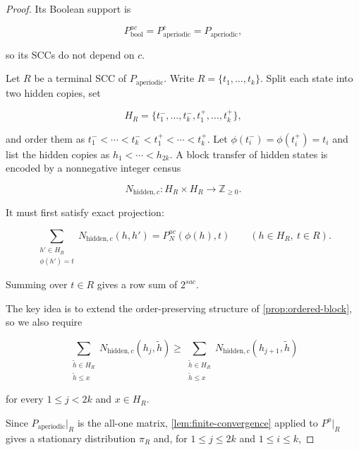 \documentclass[10pt]{article}
\theoremstyle{definition}
\begin{document}
\begin{proof}
Its Boolean support is

\begin{equation}
 P_{\mathrm{bool}}^{ac}
 =
 P_{\mathrm{aperiodic}}^c
 =
 P_{\mathrm{aperiodic}},
\end{equation}

so its SCCs do not depend on $c$.

Let $R$ be a terminal SCC of $P_{\mathrm{aperiodic}}$.  Write
$R=\{t_1,\ldots,t_k\}$.  Split each state into two hidden copies, set

\begin{equation}
 H_R=\{t_1^-,\ldots,t_k^-,t_1^+,\ldots,t_k^+\},
\end{equation}

and order them as
$t_1^-<\cdots<t_k^-<t_1^+<\cdots<t_k^+$.  Let
$\phi(t_i^-)=\phi(t_i^+)=t_i$ and list the hidden copies as
$h_1<\cdots<h_{2k}$.  A block transfer of hidden states is encoded by a
nonnegative integer census

\begin{equation}
 N_{\mathrm{hidden},c}:H_R\times H_R\longrightarrow\mathbb Z_{\ge0}.
\end{equation}

It must first satisfy exact projection:

\begin{equation}
 \sum_{\substack{h'\in H_R\\\phi(h')=t}}
 N_{\mathrm{hidden},c}(h,h')
 =
 P_N^{ac}(\phi(h),t)
 \qquad(h\in H_R,\ t\in R).
\end{equation}

Summing over $t\in R$ gives a row sum of $2^{sac}$.

The key idea is to extend the order-preserving structure of
\cref{prop:ordered-block}, so we also require

\begin{equation}
 \sum_{\substack{\widetilde h\in H_R\\\widetilde h\le x}}
 N_{\mathrm{hidden},c}(h_j,\widetilde h)
 \ge
 \sum_{\substack{\widetilde h\in H_R\\\widetilde h\le x}}
 N_{\mathrm{hidden},c}(h_{j+1},\widetilde h)
\end{equation}

for every $1\le j<2k$ and $x\in H_R$.

Since $P_{\mathrm{aperiodic}}|_R$ is the all-one matrix,
\cref{lem:finite-convergence} applied to $P^a|_R$ gives a stationary
distribution $\pi_R$ and, for $1\le j\le2k$ and $1\le i\le k$,


\end{proof}
\end{document}
